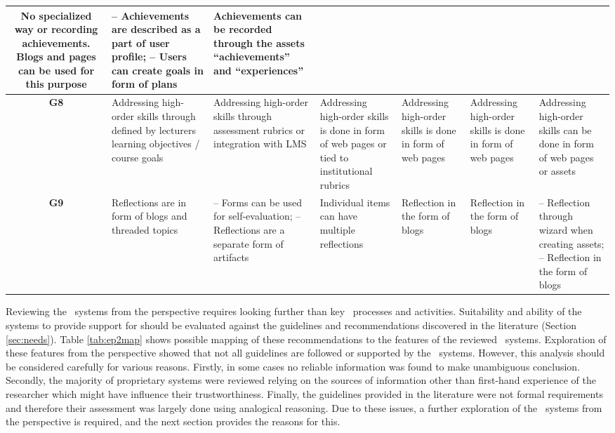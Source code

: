 \begin{sidewaystable}
\begin{tabular}{|c|p{3.25cm}|p{3.25cm}|p{3.25cm}|p{3.25cm}|p{3.25cm}|p{3.25cm}|}
	No specialized way or recording achievements. Blogs and pages can be used for
	this purpose & 
	-- Achievements are described as a part of user profile; \newline -- Users can
	create goals in form of plans & 
	Achievements can be recorded through the assets ``achievements''
	and ``experiences''	\\ \hline 
	\textbf{G8} & 
	Addressing high-order skills through defined by lecturers learning
	objectives / course goals & 
	Addressing high-order skills through assessment rubrics or integration with LMS
	& 
	Addressing high-order skills is done in form of web pages or tied to
	institutional rubrics & 
	Addressing high-order skills is done in form of web pages & 
	Addressing high-order skills is done in form of web pages & 
	Addressing high-order skills can be done in form of web pages or assets \\
	\hline 
	\textbf{G9} & 
	Reflections are in form of blogs and threaded topics & 
	-- Forms can be used for self-evaluation; \newline -- Reflections are a
	separate form of artifacts & 
	Individual items can have multiple reflections & 
	Reflection in the form of blogs & 
	Reflection in the form of blogs & 
	-- Reflection through wizard when creating assets; \newline -- Reflection in
	the form of blogs \\ \hline
	\end{tabular}
\caption{Mapping \ep~systems' features against \LLLs guidelines}
\label{tab:ep2map} 
\end{sidewaystable} 

Reviewing the \ep~systems from the \LLLs perspective requires looking further
than key \ep~processes and activities. Suitability and ability of the systems
to provide support for \LLLs should be evaluated against the guidelines and
recommendations discovered in the literature (Section \ref{sec:needs}). Table
\ref{tab:ep2map} shows possible mapping of these recommendations to the features
of the reviewed \ep~systems. Exploration of these features from the \LLLs
perspective showed that not all guidelines are followed or supported by the
\ep~systems. However, this analysis should be considered carefully for various
reasons. Firstly, in some cases no reliable information was found to make
unambiguous conclusion. Secondly, the majority of proprietary systems were
reviewed relying on the sources of information other than first-hand experience
of the researcher which might have influence their trustworthiness. Finally, the
guidelines provided in the literature were not formal requirements and therefore
their assessment was largely done using analogical reasoning. Due to these
issues, a further exploration of the \ep~systems from the \LLLs perspective is
required, and the next section provides the reasons for this.

